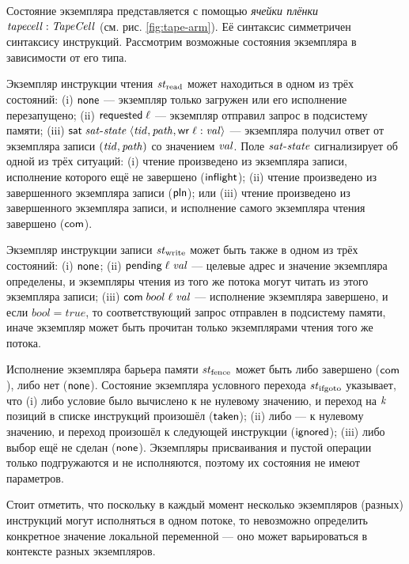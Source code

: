 Состояние экземпляра представляется с помощью \emph{ячейки плёнки} $\mathit{tapecell}: \mathit{TapeCell}$ (см. рис. \ref{fig:tape-arm}).
Её синтаксис симметричен синтаксису инструкций. Рассмотрим возможные состояния экземпляра в зависимости от его типа.

Экземпляр инструкции чтения $\mathit{st}_{\textup{\rm read}}$ может находиться в одном из трёх состояний:
(i)   $\mathsf{none}$ --- экземпляр только загружен или его исполнение перезапущено;
(ii)  $\mathsf{requested} \; \ell$ --- экземпляр отправил запрос в подсистему памяти;
(iii) $\mathsf{sat} \; \mathit{sat\text{-}state} \; \langle \mathit{tid},  \mathit{path}, {\sf wr} \;  \ell:\mathit{val} \rangle$ ---
      экземпляра получил ответ от экземпляра записи $(\mathit{tid}, \mathit{path})$ со значением $\mathit{val}$.
      Поле $\mathit{sat\text{-}state}$ сигнализирует об одной из трёх ситуаций:
      (i) чтение произведено из экземпляра записи, исполнение которого ещё не завершено
      ($\mathsf{inflight}$);
      (ii) чтение произведено из завершенного экземпляра записи ($\mathsf{pln}$); или
      (iii) чтение произведено из завершенного экземпляра записи, и исполнение самого
      экземпляра чтения завершено ($\mathsf{com}$).

Экземпляр инструкции записи $\mathit{st}_{\textup{\rm write}}$ может быть также в одном из трёх состояний:
(i)   $\mathsf{none}$;
(ii)  $\textsf{pending} \; \ell \; \mathit{val}$ --- целевые адрес и значение экземпляра определены,
и экземпляры чтения из того же потока могут читать из этого экземпляра записи;
(iii) $\mathsf{com} \; bool \; \ell \; \mathit{val}$ --- исполнение экземпляра завершено,
и если $bool = true$, то соответствующий запрос отправлен в подсистему памяти,
иначе экземпляр может быть прочитан только экземплярами чтения того же потока.

Исполнение экземпляра барьера памяти $\mathit{st}_{\textup{\rm fence}}$ может быть либо завершено 
($\mathsf{com}$), либо нет ($\mathsf{none}$).
Состояние экземпляра условного перехода $\mathit{st}_{\textup{\rm ifgoto}}$ указывает, что
(i) либо условие было вычислено к не нулевому значению, и переход на $\mathit{k}$ позиций в 
списке инструкций произошёл ($\mathsf{taken}$); (ii) либо --- к нулевому значению, и переход произошёл
к следующей инструкции ($\mathsf{ignored}$); (iii) либо выбор ещё не сделан ($\mathsf{none}$).
Экземпляры присваивания и пустой операции только подгружаются и не исполняются, поэтому
их состояния не имеют параметров.

Стоит отметить, что поскольку в каждый момент несколько экземпляров
(разных) инструкций могут исполняться в одном потоке, то невозможно определить
конкретное значение локальной переменной --- оно может варьироваться в
контексте разных экземпляров.

